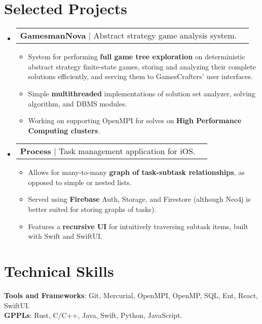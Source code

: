 \documentclass[letterpaper,11pt]{article}
\makeatletter
\newcommand{\resumeItem}[1]{
  \item\small{
    {#1 \vspace{-2pt}}
  }
}
\newcommand{\resumeProjectHeading}[1]{
    \item
    \begin{tabular*}{0.97\textwidth}{l@{\extracolsep{\fill}}r}
      \small#1 \\
    \end{tabular*}\vspace{-7pt}
}
\newcommand{\resumeSubHeadingListStart}{\begin{itemize}[leftmargin=0.15in, label={}]}
\newcommand{\resumeSubHeadingListEnd}{\end{itemize}}
\newcommand{\resumeItemListStart}{\begin{itemize}}
\newcommand{\resumeItemListEnd}{\end{itemize}\vspace{-5pt}}
\makeatother
\begin{document}
\section{Selected Projects}
    \resumeSubHeadingListStart
          \resumeProjectHeading
          {\textbf{GamesmanNova} $|$ Abstract strategy game analysis system.}
          \resumeItemListStart
            \resumeItem{System for performing \textbf{full game tree exploration} on deterministic abstract strategy finite-state games, storing and analyzing their complete solutions efficiently, and serving them to GamesCrafters' user interfaces.}
            \resumeItem{Simple \textbf{multithreaded} implementations of solution set analyzer, solving algorithm, and DBMS modules.}
            \resumeItem{Working on supporting OpenMPI for solves on \textbf{High Performance Computing clusters}.}
          \resumeItemListEnd
      \resumeProjectHeading
          {\textbf{Process} $|$ Task management application for iOS.}
          \resumeItemListStart
            \resumeItem{Allows for many-to-many \textbf{graph of task-subtask relationships}, as opposed to simple or nested lists.}
            \resumeItem{Served using \textbf{Firebase} Auth, Storage, and Firestore (although Neo4j is better suited for storing graphs of tasks).}
            \resumeItem{Features a \textbf{recursive UI} for intuitively traversing subtask items, built with Swift and SwiftUI.}
          \resumeItemListEnd
    \resumeSubHeadingListEnd
%
\section{Technical Skills}
 \begin{itemize}[leftmargin=0.15in, label={}]
    \small{\item{
     \textbf{Tools and Frameworks}{: Git, Mercurial, OpenMPI, OpenMP, SQL, Ent, React, SwiftUI.} \\
     \textbf{GPPLs}{: Rust, C/C++, Java, Swift, Python, JavaScript.} \\
    }}
 \end{itemize}


\end{document}
